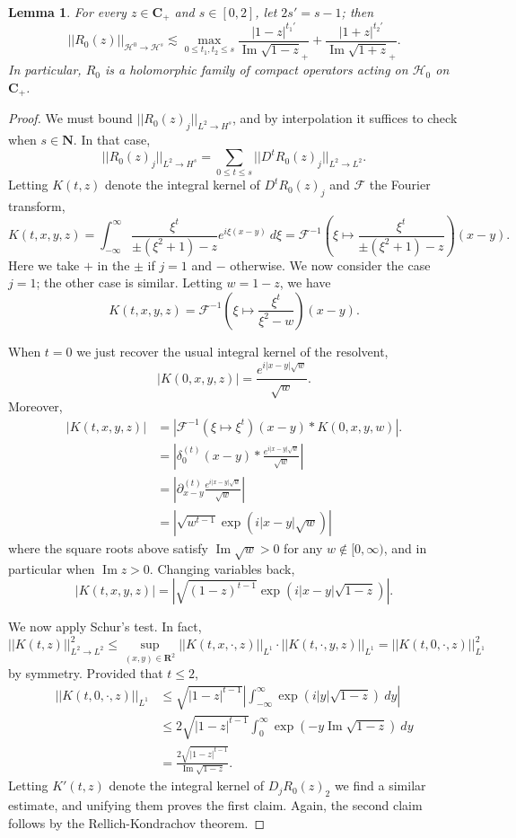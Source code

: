\documentclass[reqno,12pt,letterpaper]{amsart}
\newcommand{\NN}{\mathbf{N}}
\newcommand{\RR}{\mathbf{R}}
\newcommand{\CC}{\mathbf{C}}
\renewcommand{\Im}{\operatorname{Im}}
\newtheorem{lemma}[theorem]{Lemma}
\theoremstyle{definition}
\begin{document}
\begin{lemma}
\label{sharp bound on upper half free resolvent}
For every $z \in \CC_+$ and $s \in [0, 2]$, let $2s' = s - 1$; then
$$||R_0(z)||_{\mathcal H^0 \to \mathcal H^s} \lesssim \max_{0 \leq t_1,t_2 \leq s} \frac{|1-z|^{t_1'}}{\Im \sqrt{1 - z}_+} + \frac{|1+z|^{t_2'}}{\Im \sqrt{1+ z}_+}.$$
In particular, $R_0$ is a holomorphic family of compact operators acting on $\mathcal H_0$ on $\CC_+$.
\end{lemma}
\begin{proof}
We must bound $||R_0(z)_j||_{L^2 \to H^s}$, and by interpolation it suffices to check when $s \in \NN$. In that case,
$$||R_0(z)_j||_{L^2 \to H^s} = \sum_{0 \leq t \leq s} ||D^tR_0(z)_j||_{L^2 \to L^2}.$$
Letting $K(t, z)$ denote the integral kernel of $D^tR_0(z)_j$ and $\mathcal F$ the Fourier transform,
$$K(t, x, y, z) = \int_{-\infty}^\infty \frac{\xi^t}{\pm(\xi^2 + 1)-z}e^{i\xi(x-y)}~d\xi = \mathcal F^{-1}\left(\xi \mapsto \frac{\xi^t}{\pm(\xi^2 +1)-z}\right)(x-y).$$
Here we take $+$ in the $\pm$ if $j = 1$ and $-$ otherwise. We now consider the case $j = 1$; the other case is similar. Letting $w = 1 - z$, we have
$$K(t, x, y, z) = \mathcal F^{-1}\left(\xi \mapsto \frac{\xi^t}{\xi^2 - w}\right)(x-y).$$

When $t = 0$ we just recover the usual integral kernel of the resolvent,
$$|K(0, x, y, z)| = \frac{e^{i|x-y|\sqrt w}}{\sqrt w}.$$
Moreover,
\begin{align*}
  |K(t, x, y, z)| &= |\mathcal F^{-1}(\xi \mapsto \xi^t)(x-y) * K(0, x, y, w)|.\\
  &= \left|\delta^{(t)}_0(x-y) * \frac{e^{i|x-y|\sqrt w}}{\sqrt w}\right|\\
  &= \left|\partial_{x-y}^{(t)} \frac{e^{i|x-y|\sqrt w}}{\sqrt w}\right|\\
  &= \left|\sqrt{w^{t-1}} \exp(i|x-y|\sqrt w)\right|
\end{align*}
where the square roots above satisfy $\Im \sqrt w > 0$ for any $w \notin [0, \infty)$, and in particular when $\Im z > 0$. Changing variables back,
$$|K(t, x, y, z)| = \left|\sqrt{(1-z)^{t-1}} \exp(i|x-y|\sqrt{1-z})\right|.$$

We now apply Schur's test. In fact,
$$||K(t, z)||_{L^2 \to L^2}^2 \leq \sup_{(x, y) \in \RR^2} ||K(t, x, \cdot, z)||_{L^1} \cdot ||K(t, \cdot, y, z)||_{L^1} = ||K(t, 0, \cdot, z)||_{L^1}^2$$
by symmetry. Provided that $t \leq 2$,
\begin{align*}
  ||K(t, 0, \cdot, z)||_{L^1} &\leq \sqrt{|1-z|^{t-1}} \left|\int_{-\infty}^\infty \exp(i|y|\sqrt{1-z}) ~dy\right|\\
  &\leq 2\sqrt{|1-z|^{t-1}} \int_0^\infty \exp(-y\Im\sqrt{1-z})~dy\\
  &= \frac{2\sqrt{|1-z|^{t-1}}}{\Im \sqrt{1-z}}.
\end{align*}
Letting $K'(t, z)$ denote the integral kernel of $D_jR_0(z)_2$ we find a similar estimate, and unifying them proves the first claim.
Again, the second claim follows by the Rellich-Kondrachov theorem.
\end{proof}
\end{document}

